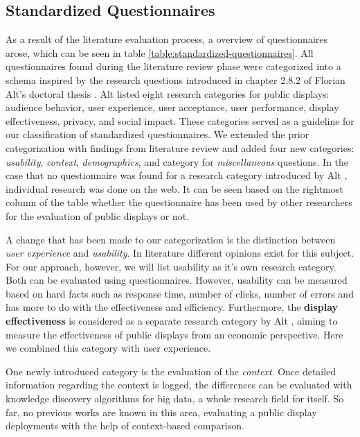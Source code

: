 \subsection{Standardized Questionnaires}
\label{section:questionnaires:categorization}


	As a result of the literature evaluation process, a overview of questionnaires arose, which can be seen in table \ref{table:standardized-questionnaires}. All questionnaires found during the literature review phase were categorized into a schema inspired by the research questions introduced in chapter 2.8.2 of Florian Alt's doctoral thesis \cite{alt2013thesis}. Alt listed eight research categories for public displays: audience behavior, user experience, user acceptance, user performance, display effectiveness, privacy, and social impact. These categories served as a guideline for our classification of standardized questionnaires. We extended the prior categorization with findings from literature review and added four new categories: \textit{usability}, \textit{context}, \textit{demographics}, and category for \textit{miscellaneous} questions. In the case that no questionnaire was found for a research category introduced by Alt \cite{alt2013thesis}, individual research was done on the web. It can be seen based on the rightmost column of the table whether the questionnaire has been used by other researchers for the evaluation of public displays or not.

	A change that has been made to our categorization is the distinction between \textit{user experience} and \textit{usability}. In literature different opinions exist for this subject. For our approach, however, we will list usability as it's own research category. Both can be evaluated using questionnaires. However, usability can be measured based on hard facts such as response time, number of clicks, number of errors and has more to do with the effectiveness and efficiency. \cite{bevan2009difference}
	Furthermore, the \textbf{display effectiveness} is considered as a separate research category by Alt \cite{alt2013thesis}, aiming to measure the effectiveness of public displays from an economic perspective. Here we combined this category with user experience.

	One newly introduced category is the evaluation of the \textit{context}. Once detailed information regarding the context is logged, the differences can be evaluated with knowledge discovery algorithms for big data, a whole research field for itself. So far, no previous works are known in this area, evaluating a public display deployments with the help of context-based comparison. 

